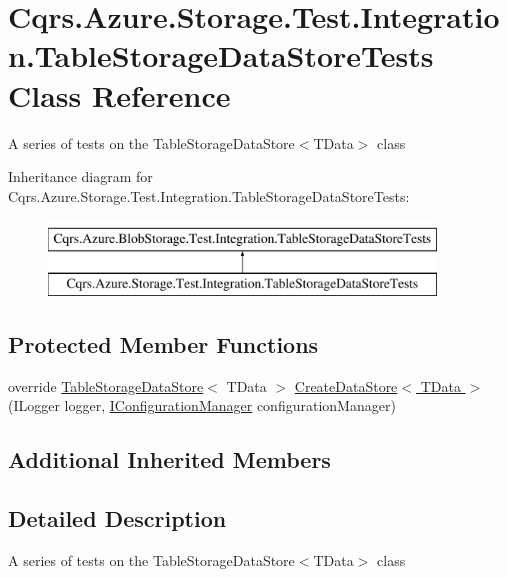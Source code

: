 \hypertarget{classCqrs_1_1Azure_1_1Storage_1_1Test_1_1Integration_1_1TableStorageDataStoreTests}{}\section{Cqrs.\+Azure.\+Storage.\+Test.\+Integration.\+Table\+Storage\+Data\+Store\+Tests Class Reference}
\label{classCqrs_1_1Azure_1_1Storage_1_1Test_1_1Integration_1_1TableStorageDataStoreTests}


A series of tests on the Table\+Storage\+Data\+Store$<$\+T\+Data$>$ class  


Inheritance diagram for Cqrs.\+Azure.\+Storage.\+Test.\+Integration.\+Table\+Storage\+Data\+Store\+Tests\+:\begin{figure}[H]
\begin{center}
\leavevmode
\includegraphics[height=2.000000cm]{classCqrs_1_1Azure_1_1Storage_1_1Test_1_1Integration_1_1TableStorageDataStoreTests}
\end{center}
\end{figure}
\subsection*{Protected Member Functions}
\begin{DoxyCompactItemize}
\item 
override \hyperlink{classCqrs_1_1Azure_1_1BlobStorage_1_1DataStores_1_1TableStorageDataStore}{Table\+Storage\+Data\+Store}$<$ T\+Data $>$ \hyperlink{classCqrs_1_1Azure_1_1Storage_1_1Test_1_1Integration_1_1TableStorageDataStoreTests_a4c23960b33f58ea56707d736616a9f53}{Create\+Data\+Store$<$ T\+Data $>$} (I\+Logger logger, \hyperlink{interfaceCqrs_1_1Configuration_1_1IConfigurationManager}{I\+Configuration\+Manager} configuration\+Manager)
\end{DoxyCompactItemize}
\subsection*{Additional Inherited Members}


\subsection{Detailed Description}
A series of tests on the Table\+Storage\+Data\+Store$<$\+T\+Data$>$ class 



